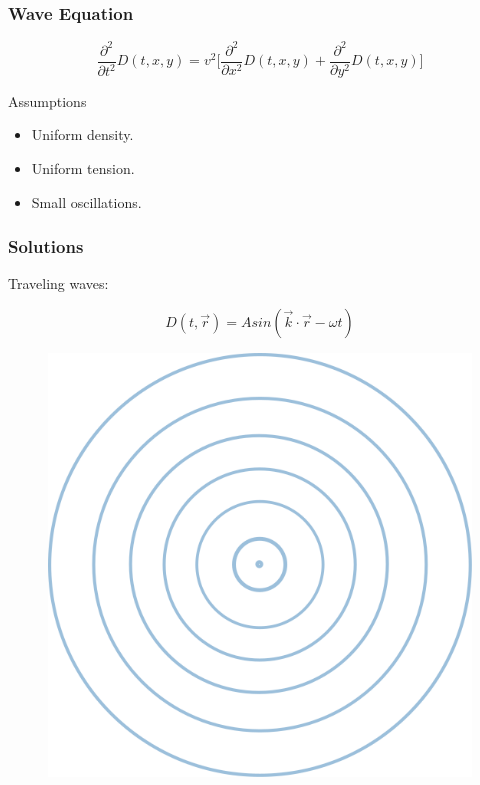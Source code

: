 \documentclass[]{beamer}
\begin{document}
\begin{frame}
  \frametitle{Wave Equation }
  

  \begin{equation*}
    \frac{\partial^2 }{\partial t^2} D(t,x,y) =v^2\bigg[ \frac{\partial^2}{\partial x^2} D(t,x,y)+\frac{\partial^2 }{\partial y^2}D(t,x,y)\bigg]
  \end{equation*}
  
\vspace{5mm}


  \pause
Assumptions
\pause
\vspace{3mm}

  \begin{itemize}
    \item Uniform density.\pause
    \item Uniform tension.\pause
    \item Small oscillations.\pause
  \end{itemize}



  

    \end{frame}
  
  


\begin{frame}
  \frametitle{Solutions}
  
Traveling waves:

\begin{equation*}
  D(t,\vec{r})=Asin(\vec{k}\cdot \vec{r}-\omega t)
\end{equation*}

  \begin{figure}[h!]
    \begin{center}
      \includegraphics[height=2.in]{images4/top_view.png}
    \end{center}
  \end{figure}
  

  

    \end{frame}
  
\end{document}
